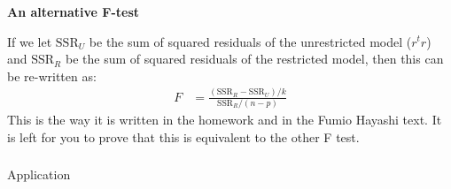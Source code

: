 \begin{frame}[fragile] \frametitle{}

{\bf An alternative F-test}

If we let $\text{SSR}_U$ be the sum of squared residuals of the unrestricted
model ($r^t r$) and $\text{SSR}_R$ be the sum of squared residuals of the
restricted model, then this can be re-written as:
\begin{align*}
F &= \frac{(\text{SSR}_R -  \text{SSR}_U) / k }{\text{SSR}_R / (n - p)}
\end{align*}
This is the way it is written in the homework and in the Fumio Hayashi
text. It is left for you to prove that this is equivalent to the
other F test.

\end{frame}

\begin{frame}[fragile] \frametitle{}

\begin{flushright}
{\color{yaleblue}\sc\fontsize{1cm}{0cm}\selectfont Application}
\end{flushright}

\end{frame}













